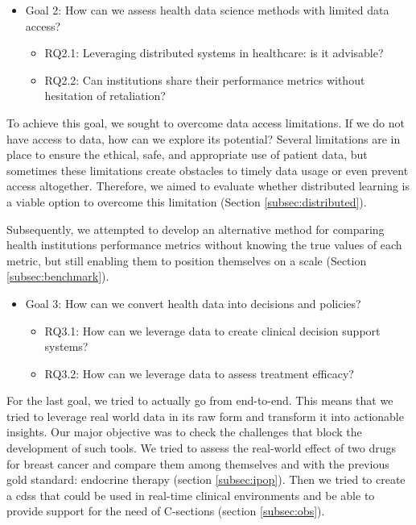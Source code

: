 \begin{itemize}

    \item Goal 2: How can we assess health data science methods with limited data access?
    \begin{itemize}
        \item RQ2.1: Leveraging distributed systems in healthcare: is it advisable?
        \item RQ2.2: Can institutions share their performance metrics without hesitation of retaliation?
    \end{itemize}
\end{itemize}

To achieve this goal, we sought to overcome data access limitations. If we do not have access to data, how can we explore its potential? Several limitations are in place to ensure the ethical, safe, and appropriate use of patient data, but sometimes these limitations create obstacles to timely data usage or even prevent access altogether. Therefore, we aimed to evaluate whether distributed learning is a viable option to overcome this limitation (Section \ref{subsec:distributed}).

Subsequently, we attempted to develop an alternative method for comparing health institutions performance metrics without knowing the true values of each metric, but still enabling them to position themselves on a scale (Section \ref{subsec:benchmark}).

\begin{itemize}
    \item Goal 3: How can we convert health data into decisions and policies?
    \begin{itemize}
        \item RQ3.1: How can we leverage data to create clinical decision support systems?
        \item RQ3.2: How can we leverage data to assess treatment efficacy?
    \end{itemize}    
\end{itemize}

For the last goal, we tried to actually go from end-to-end. This means that we tried to leverage real world data in its raw form and transform it into actionable insights. Our major objective was to check the challenges that block the development of such tools. We tried to assess the real-world effect of two drugs for breast cancer and compare them among themselves and with the previous gold standard: endocrine therapy (section \ref{subsec:ipop}). Then we tried to create a \ac{cdss} that could be used in real-time clinical environments and be able to provide support for the need of C-sections (section \ref{subsec:obs}). 


